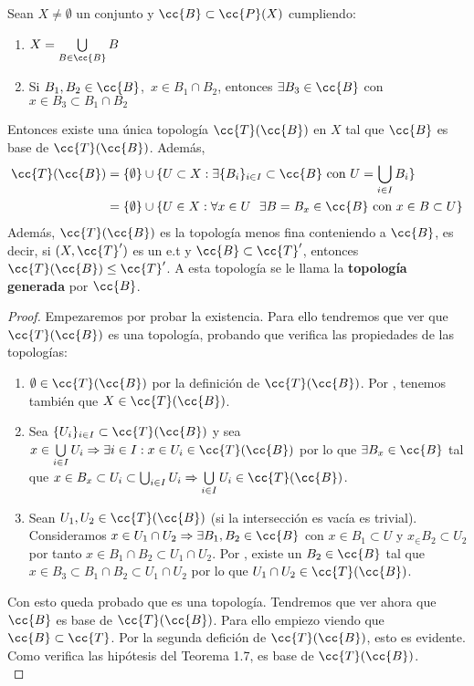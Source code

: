 \begin{teo}
    Sean $X\neq \emptyset$ un conjunto y $\cc{B}\subset \cc{P}(X)$ cumpliendo:
    \begin{enumerate}
        \item[\apuntar{B1}] $X=\bigcup\limits_{B\in \cc{B}}B$
        \item[\apuntar{B2}] Si $B_1,B_2\in \cc{B}$,\ $x\in B_1\cap B_2$, entonces $\exists B_3 \in \cc{B}$ con $x\in B_3 \subset B_1 \cap B_2$
    \end{enumerate}
    Entonces existe una única topología $\cc{T}(\cc{B})$ en $X$ tal que $\cc{B}$ es base de $\cc{T}(\cc{B})$. Además,
    \begin{align*}
        \cc{T}(\cc{B})&=\{\emptyset\}\cup\{U\subset X : \exists \{B_i\}_{i\in I}\subset \cc{B} \text{ con } U = \bigcup\limits_{i\in I}B_i\}\\
        &=\{\emptyset\}\cup \{U\in X:\forall x\in U\ \ \exists B=B_x\in \cc{B} \text{ con } x\in B\subset U \}
    \end{align*}
    Además, $\cc{T}(\cc{B})$ es la topología menos fina conteniendo a $\cc{B}$, es decir, si $(X,\cc{T}')$ es un e.t y $\cc{B}\subset \cc{T}'$, entonces $\cc{T}(\cc{B})\leq \cc{T}'$. A esta topología se le llama la \textbf{topología generada} por $\cc{B}$.

    \begin{proof}
        Empezaremos por probar la existencia. Para ello tendremos que ver que $\cc{T}(\cc{B})$ es una topología, probando que verifica las propiedades de las topologías:
        \begin{enumerate}[label=(A\arabic*)]
            \item $\emptyset\in \cc{T}(\cc{B})$ por la definición de $\cc{T}(\cc{B})$. Por , tenemos también que $X\in \cc{T}(\cc{B})$.
            \item Sea $\{U_i\}_{i\in I}\subset \cc{T}(\cc{B})$ y sea $x\in \bigcup\limits_{i\in I}U_i\Rightarrow \exists i \in I : x\in U_i\in \cc{T}(\cc{B})$ por lo que $\exists B_x\in \cc{B}$ tal que $x \in B_x \subset U_i\subset \bigcup_{i\in I}U_i\Rightarrow \bigcup\limits_{i\in I}U_i \in \cc{T}(\cc{B})$.
            \item Sean $U_1, U_2 \in \cc{T}(\cc{B})$ (si la intersección es vacía es trivial). Consideramos $x\in U_1\cap U_2\Rightarrow \exists B_1, B_2 \in \cc{B}$ con $x \in B_1 \subset U$ y $x_\in B_2\subset U_2$ por tanto $x\in B_1 \cap B_2 \subset U_1 \cap U_2$. Por , existe un $B_2\in \cc{B}$ tal que $x\in B_3 \subset B_1\cap B_2 \subset U_1 \cap U_2$ por lo que $U_1\cap U_2\in \cc{T}(\cc{B})$.
        \end{enumerate}
        Con esto queda probado que es una topología. Tendremos que ver ahora que $\cc{B}$ es base de $\cc{T}(\cc{B})$. Para ello empiezo viendo que $\cc{B}\subset \cc{T}$. Por la segunda defición de $\cc{T}(\cc{B})$, esto es evidente. Como verifica las hipótesis del Teorema 1.7, es base de $\cc{T}(\cc{B})$.\\


\end{proof}
\end{teo}
